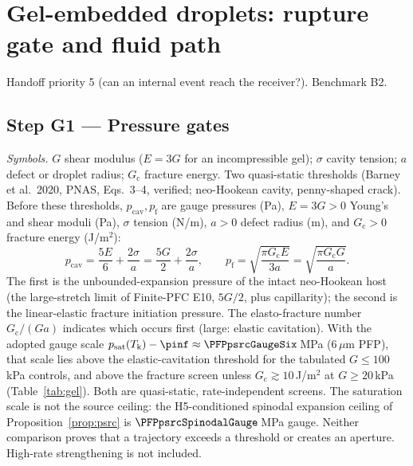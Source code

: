 \section{Gel-embedded droplets: rupture gate and fluid path}\label{sec:gel}
Handoff priority 5 (can an internal event reach the receiver?). Benchmark B2.

\subsection{Step G1 --- Pressure gates}
\emph{Symbols.} $G$ shear modulus ($E=3G$ for an incompressible gel); $\sigma$ cavity tension; $a$ defect or
droplet radius; $G_{\mathrm c}$ fracture energy. Two quasi-static thresholds (Barney et al.\ 2020, PNAS, Eqs.~3--4,
verified; neo-Hookean cavity, penny-shaped crack). Before these thresholds,
$p_{\mathrm{cav}},p_{\mathrm f}$ are gauge pressures (Pa), $E=3G>0$ Young's and shear moduli (Pa),
$\sigma$ tension (N/m), $a>0$ defect radius (m), and $G_{\mathrm c}>0$ fracture energy (J/m$^2$):
\begin{equation}
p_{\mathrm{cav}}=\frac{5E}{6}+\frac{2\sigma}{a}=\frac{5G}{2}+\frac{2\sigma}{a},\qquad
p_{\mathrm f}=\sqrt{\frac{\pi G_{\mathrm c}E}{3a}}=\sqrt{\frac{\pi G_{\mathrm c}G}{a}} .\label{eq:gates}
\end{equation}
The first is the unbounded-expansion pressure of the intact neo-Hookean host (the large-stretch limit of
Finite-PFC E10, $5G/2$, plus capillarity); the second is the linear-elastic fracture initiation pressure.
The elasto-fracture number $G_{\mathrm c}/(Ga)$ indicates which occurs first (large: elastic cavitation). With
the adopted gauge scale $p_{\mathrm{sat}}(T_{\mathrm k})-\pinf\approx\PFPpsrcGaugeSix$\,MPa
(6\,$\mu$m PFP), that scale lies
above the elastic-cavitation threshold for the tabulated $G\le100$\,kPa controls, and above the fracture screen unless
$G_{\mathrm c}\gtrsim10$\,J/m$^2$ at $G\ge20$\,kPa (Table~\ref{tab:gel}). Both are quasi-static, rate-independent
screens. The saturation scale is not the source ceiling: the H5-conditioned spinodal expansion
ceiling of Proposition~\ref{prop:psrc} is $\PFPpsrcSpinodalGauge$\,MPa gauge. Neither comparison
proves that a trajectory exceeds a threshold or creates an aperture. High-rate strengthening is not included.

